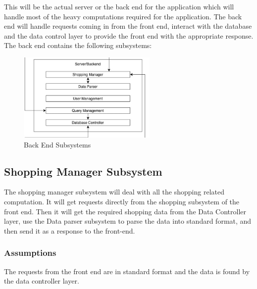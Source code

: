 This will be the actual server or the back end for the application which will handle most of the heavy computations required for the application. The back end will handle requests coming in from the front end, interact with the database and the data control layer to provide the front end with the appropriate response. The back end contains the following subsystems:

\begin{figure}[h!]
	\centering
 	\includegraphics[width=0.60\textwidth]{images/Server.png}
 \caption{Back End Subsystems}
\end{figure}

\subsection{Shopping Manager Subsystem}
The shopping manager subsystem will deal with all the shopping related computation. It will get requests directly from the shopping subsystem of the front end. Then it will get the required shopping data from the Data Controller layer, use the Data parser subsystem to parse the data into standard format, and then send it as a response to the front-end.


\subsubsection{Assumptions}
The requests from the front end are in standard format and the data is found by the data controller layer.

